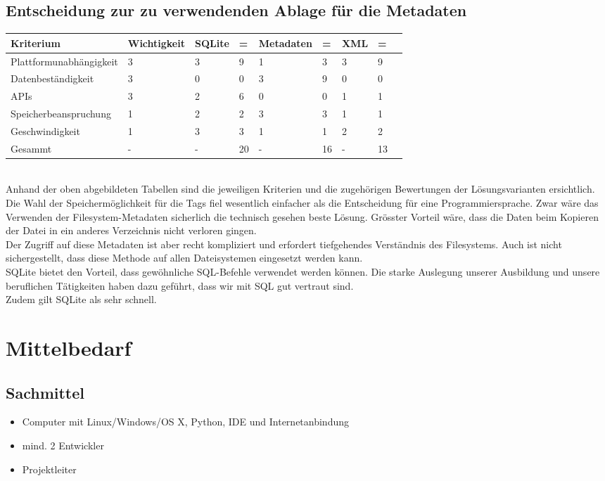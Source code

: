 \documentclass[10pt,paper=a4,final]{scrartcl}
\begin{document}
\subsection{Entscheidung zur zu verwendenden Ablage f\"ur die Metadaten}
\begin{tabularx}{\textwidth}{ |l|X|X|l|X|l|X|l|X| }
\hline
Kriterium & Wichtigkeit & SQLite & = & Metadaten & = & XML & = \\ \hline
Plattformunabhängigkeit & 3 & 3 & 9 & 1 & 3 & 3 & 9 \\ \hline
Datenbeständigkeit & 3 & 0 & 0 & 3 & 9 & 0 & 0 \\ \hline
APIs & 3 & 2 & 6 & 0 & 0 & 1 & 1 \\ \hline
Speicherbeanspruchung & 1 & 2 & 2 & 3 & 3 & 1 & 1 \\ \hline
Geschwindigkeit & 1 & 3 & 3 & 1 & 1 & 2 & 2 \\ \hline
Gesammt & - & - & 20 \cellcolor{green!80!}& - & 16 \cellcolor{red!80!}& - & 13 \cellcolor{red!80!} \\ \hline
\end{tabularx}
\\
Anhand der oben abgebildeten Tabellen sind die jeweiligen Kriterien und die zugehörigen Bewertungen der Lösungsvarianten ersichtlich.\\
Die Wahl der Speichermöglichkeit für die Tags fiel wesentlich einfacher als die Entscheidung für eine Programmiersprache. Zwar wäre das Verwenden der Filesystem-Metadaten sicherlich die technisch gesehen beste Lösung. Grösster Vorteil wäre, dass die Daten beim Kopieren der Datei in ein anderes Verzeichnis nicht verloren gingen.\\
Der Zugriff auf diese Metadaten ist aber recht kompliziert und erfordert tiefgehendes Verständnis des Filesystems. Auch ist nicht sichergestellt, dass diese Methode auf allen Dateisystemen eingesetzt werden kann.\\
SQLite bietet den Vorteil, dass gewöhnliche SQL-Befehle verwendet werden können. Die starke Auslegung unserer Ausbildung und unsere beruflichen Tätigkeiten haben dazu geführt, dass wir mit SQL gut vertraut sind.\\
Zudem gilt SQLite als sehr schnell.

\section{Mittelbedarf}
\subsection{Sachmittel}
\begin{itemize}
\item Computer mit Linux/Windows/OS X, Python, IDE und Internetanbindung
\item mind. 2 Entwickler
\item Projektleiter
\end{itemize}
\end{document}
